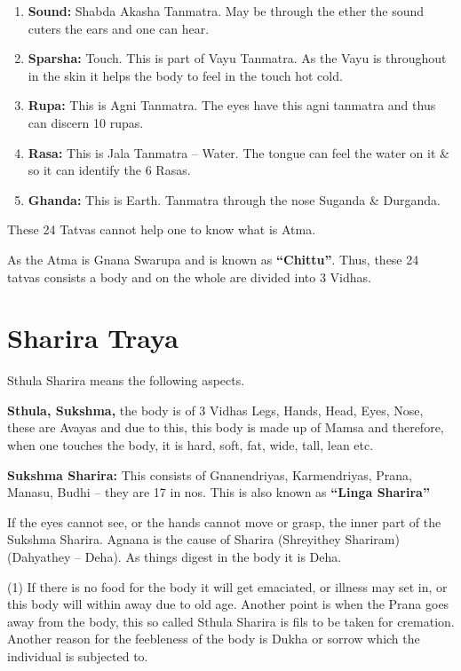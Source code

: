\begin{enumerate}
\item \textbf{Sound:} Shabda Akasha Tanmatra. May be through the ether the sound cuters the ears and one can hear.

 \item \textbf{Sparsha:} Touch. This is part of Vayu Tanmatra. As the Vayu is throughout in the skin it helps the body to feel in the touch hot cold.

 \item \textbf{Rupa:} This is Agni Tanmatra. The eyes have this agni tanmatra and thus can discern 10 rupas.

 \item \textbf{Rasa:} This is Jala Tanmatra – Water. The tongue can feel the water on it \& so it can identify the 6 Rasas.

 \item \textbf{Ghanda:} This is Earth. Tanmatra through the nose Suganda \& Durganda.

\end{enumerate}

These 24 Tatvas cannot help one to know what is Atma.

As the Atma is Gnana Swarupa and is known as \textbf{“Chittu”}. Thus, these 24 tatvas consists a body and on the whole are divided into 3 Vidhas.

\chapter{Sharira Traya}

Sthula Sharira means the following aspects.

\textbf{Sthula, Sukshma,} the body is of 3 Vidhas Legs, Hands, Head, Eyes, Nose, these are Avayas and due to this, this body is made up of Mamsa and therefore, when one touches the body, it is hard, soft, fat, wide, tall, lean etc.

\textbf{Sukshma Sharira:} This consists of Gnanendriyas, Karmendriyas, Prana, Manasu, Budhi – they are 17 in nos. This is also known as \textbf{“Linga Sharira”}

If the eyes cannot see, or the hands cannot move or grasp, the inner part of the Sukshma Sharira. Agnana is the cause of Sharira (Shreyithey Shariram) (Dahyathey – Deha). As things digest in the body it is Deha.

(1) If there is no food for the body it will get emaciated, or illness may set in, or this body will within away due to old age. Another point is when the Prana goes away from the body, this so called Sthula Sharira is fils to be taken for cremation. Another reason for the feebleness of the body is Dukha or sorrow which the individual is subjected to.

